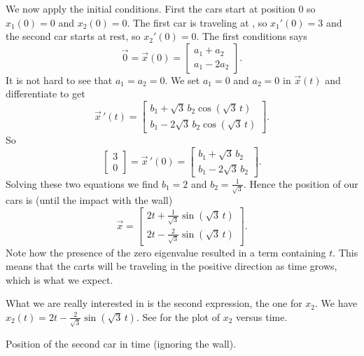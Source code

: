 \documentclass[12pt]{book}
\begin{document}
\begin{example}
We now apply the initial conditions.  First the cars start at position 0
so $x_1 (0) = 0$ and $x_2(0) = 0$.  The first car is traveling at
,
so $x_1'(0) = 3$ and the second car starts at rest, so $x_2'(0) = 0$.
The first conditions says
\begin{equation*}
\vec{0} = \vec{x}(0) = 
\begin{bmatrix}
a_1 + a_2 \\
a_1 - 2 a_2 
\end{bmatrix} .
\end{equation*}
It is not hard to see that $a_1 = a_2 = 0$.  We set $a_1=0$
and $a_2=0$ in $\vec{x}(t)$
and differentiate to get
\begin{equation*}
{\vec{x}\,}'(t)
=
\begin{bmatrix}
b_1 + \sqrt{3} \, b_2 \cos (\! \sqrt{3} \, t ) \\
b_1 - 2 \sqrt{3} \, b_2 \cos (\! \sqrt{3} \, t )
\end{bmatrix} .
\end{equation*}
So
\begin{equation*}
\begin{bmatrix} 3 \\ 0 \end{bmatrix} = 
{\vec{x}\,}'(0)
=
\begin{bmatrix}
b_1 + \sqrt{3} \, b_2 \\
b_1 - 2 \sqrt{3} \, b_2 
\end{bmatrix} .
\end{equation*}
Solving these two equations we
find $b_1 = 2$ and $b_2 =
\frac{1}{\sqrt{3}}$.  Hence the position of our cars is
(until the impact with the wall)
\begin{equation*}
\vec{x} = 
\begin{bmatrix}
2 t + \frac{1}{\sqrt{3}} \sin ( \! \sqrt{3} \, t ) \\
2 t - \frac{2}{\sqrt{3}} \sin ( \! \sqrt{3} \, t )
\end{bmatrix} .
\end{equation*}
Note how the presence of the zero eigenvalue resulted in a term containing $t$.
This means that the carts will be traveling in the positive direction as
time grows, which is what we expect.


What we are really interested in is the second expression, the one for $x_2$.
We have $x_2(t) = 
2 t - \frac{2}{\sqrt{3}} \sin (\! \sqrt{3} \, t)$.  See 
for the plot of $x_2$ versus time.

\begin{diffyfloatingfigurepdfonly}{3.1in}
\capstart
\begin{center}
\caption{Position of the second car in time (ignoring the wall).\label{sosa:railcarfig}}
\end{center}
\end{diffyfloatingfigurepdfonly}



\end{example}
\end{document}
